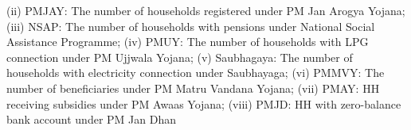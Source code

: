 \begin{table}[!htbp]
\begin{threeparttable}
\begin{tablenotes}[flushleft]
                   (ii) PMJAY: The number of households registered under PM Jan Arogya Yojana;
                   (iii) NSAP: The number of households with pensions under National Social Assistance Programme;
                   (iv) PMUY: The number of households with LPG connection under PM Ujjwala Yojana;
                   (v) Saubhagaya: The number of households with electricity connection under Saubhayaga;
                   (vi) PMMVY: The number of beneficiaries under PM Matru Vandana Yojana;
                   (vii) PMAY: HH receiving subsidies under PM Awaas Yojana;
                   (viii) PMJD: HH with zero-balance bank account under PM Jan Dhan
\end{tablenotes}
\end{threeparttable}
\end{table}
